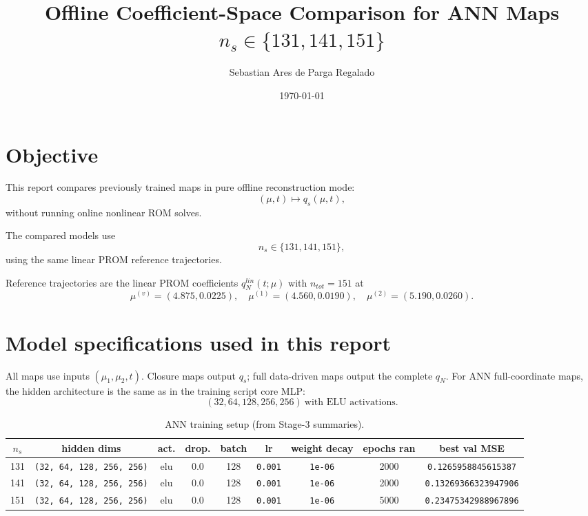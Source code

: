 \documentclass[11pt]{article}
\title{Offline Coefficient-Space Comparison for ANN Maps\\$n_s\in\{131,141,151\}$}
\author{Sebastian Ares de Parga Regalado}
\date{\today}
\begin{document}
\maketitle

\section*{Objective}
This report compares previously trained maps in pure offline reconstruction mode:
\[
(\mu,t)\mapsto q_s(\mu,t),
\]
without running online nonlinear ROM solves.

The compared models use
\[
n_s\in\{131,141,151\},
\]
using the same linear PROM reference trajectories.

Reference trajectories are the linear PROM coefficients $q_N^{lin}(t;\mu)$ with $n_{tot}=151$ at
\[
\mu^{(v)}=(4.875,0.0225),\quad
\mu^{(1)}=(4.560,0.0190),\quad
\mu^{(2)}=(5.190,0.0260).
\]


\section*{Model specifications used in this report}
All maps use inputs $(\mu_1,\mu_2,t)$. Closure maps output $q_s$; full data-driven maps output the complete $q_N$.
For ANN full-coordinate maps, the hidden architecture is the same as in the training script core MLP:
\[
(32,64,128,256,256)\ \text{with ELU activations}.
\]

\begin{table}[H]
\centering
\caption{ANN training setup (from Stage-3 summaries).}
\scriptsize
\begin{tabular}{ccccccccc}
\toprule
$n_s$ & hidden dims & act. & drop. & batch & lr & weight decay & epochs ran & best val MSE \\
\midrule
131 & \texttt{(32, 64, 128, 256, 256)} & elu & 0.0 & 128 & \texttt{0.001} & \texttt{1e-06} & 2000 & \texttt{0.1265958845615387} \\
141 & \texttt{(32, 64, 128, 256, 256)} & elu & 0.0 & 128 & \texttt{0.001} & \texttt{1e-06} & 2000 & \texttt{0.13269366323947906} \\
151 & \texttt{(32, 64, 128, 256, 256)} & elu & 0.0 & 128 & \texttt{0.001} & \texttt{1e-06} & 5000 & \texttt{0.23475342988967896} \\
\bottomrule
\end{tabular}
\end{table}
\end{document}
